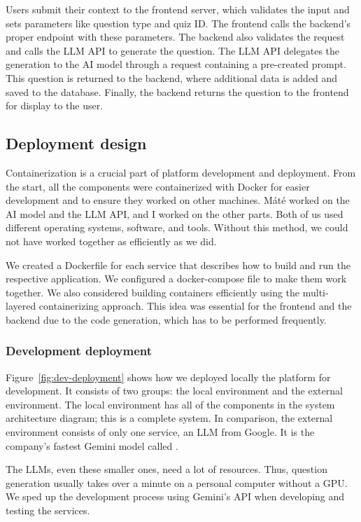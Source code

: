 Users submit their context to the frontend server, which validates the input and sets parameters like question type and quiz ID. The frontend calls the backend's proper endpoint with these parameters. The backend also validates the request and calls the LLM API to generate the question. The LLM API delegates the generation to the AI model through a request containing a pre-created prompt. This question is returned to the backend, where additional data is added and saved to the database. Finally, the backend returns the question to the frontend for display to the user.

\subsection{Deployment design}

Containerization is a crucial part of platform development and deployment. From the start, all the components were containerized with Docker for easier development and to ensure they worked on other machines. Máté worked on the AI model and the LLM API, and I worked on the other parts. Both of us used different operating systems, software, and tools. Without this method, we could not have worked together as efficiently as we did.

We created a Dockerfile for each service that describes how to build and run the respective application. We configured a docker-compose file to make them work together. We also considered building containers efficiently using the multi-layered containerizing approach. This idea was essential for the frontend and the backend due to the code generation, which has to be performed frequently.

\subsubsection{Development deployment}

Figure~\ref{fig:dev-deployment} shows how we deployed locally the platform for development. It consists of two groups: the local environment and the external environment. The local environment has all of the components in the system architecture diagram; this is a complete system. In comparison, the external environment consists of only one service, an LLM from Google. It is the company's fastest Gemini model called .

The LLMs, even these smaller ones, need a lot of resources. Thus, question generation usually takes over a minute on a personal computer without a GPU. We sped up the development process using Gemini's API when developing and testing the services.


